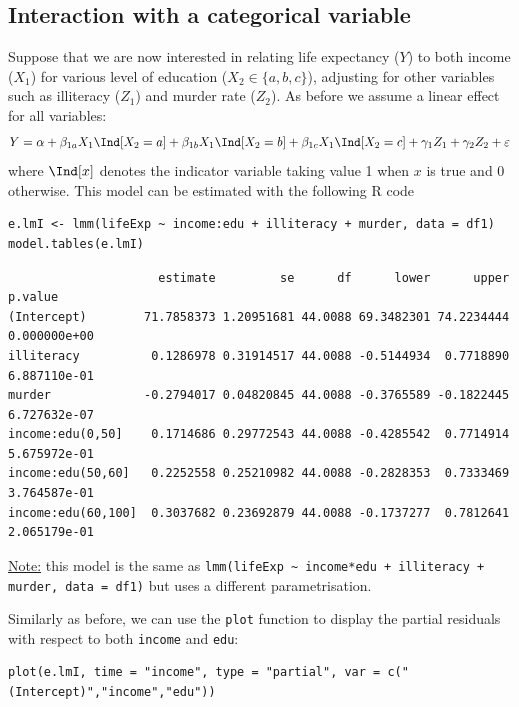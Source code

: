 \documentclass[12pt]{article}
\begin{document}
\subsection{Interaction with a categorical variable}
\label{sec:org1f09117}

Suppose that we are now interested in relating life expectancy (\(Y\))
to both income (\(X_1\)) for various level of education (\(X_2 \in
\{a,b,c\}\)), adjusting for other variables such as illiteracy
(\(Z_1\)) and murder rate (\(Z_2\)). As before we assume a linear
effect for all variables:
\begin{align*}
Y = \alpha + \beta_{1a} X_1 \Ind[X_2=a] + \beta_{1b} X_1 \Ind[X_2=b] + \beta_{1c} X_1 \Ind[X_2=c] + \gamma_1 Z_1 + \gamma_2 Z_2 + \varepsilon
\end{align*}
where \(\Ind[x]\) denotes the indicator variable taking value 1 when
\(x\) is true and 0 otherwise. This model can be estimated with the
following R code
\lstset{language=r,label= ,caption= ,captionpos=b,numbers=none}
\begin{lstlisting}
e.lmI <- lmm(lifeExp ~ income:edu + illiteracy + murder, data = df1)
model.tables(e.lmI)
\end{lstlisting}

\begin{verbatim}
                     estimate         se      df      lower      upper      p.value
(Intercept)        71.7858373 1.20951681 44.0088 69.3482301 74.2234444 0.000000e+00
illiteracy          0.1286978 0.31914517 44.0088 -0.5144934  0.7718890 6.887110e-01
murder             -0.2794017 0.04820845 44.0088 -0.3765589 -0.1822445 6.727632e-07
income:edu(0,50]    0.1714686 0.29772543 44.0088 -0.4285542  0.7714914 5.675972e-01
income:edu(50,60]   0.2252558 0.25210982 44.0088 -0.2828353  0.7333469 3.764587e-01
income:edu(60,100]  0.3037682 0.23692879 44.0088 -0.1737277  0.7812641 2.065179e-01
\end{verbatim}


\uline{Note:} this model is the same as \texttt{lmm(lifeExp \textasciitilde{} income*edu +
illiteracy + murder, data = df1)} but uses a different parametrisation.

\bigskip

Similarly as before, we can use the \texttt{plot} function to display the
partial residuals with respect to both \texttt{income} and \texttt{edu}:
\lstset{language=r,label= ,caption= ,captionpos=b,numbers=none}
\begin{lstlisting}
plot(e.lmI, time = "income", type = "partial", var = c("(Intercept)","income","edu"))
\end{lstlisting}
\end{document}
